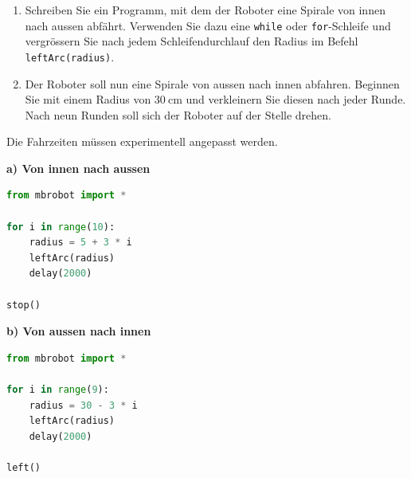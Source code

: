 \begin{myexercise}

    \begin{center}
    \end{center}

    \begin{enumerate}
        \item Schreiben Sie ein Programm, mit dem der Roboter
              eine Spirale von innen nach aussen abfährt.
              Verwenden Sie dazu eine \texttt{while} oder \texttt{for}-Schleife
              und vergrössern Sie nach jedem Schleifendurchlauf
              den Radius im Befehl \texttt{leftArc(radius)}.

        \item Der Roboter soll nun eine Spirale von aussen
              nach innen abfahren. Beginnen Sie mit einem
              Radius von \(\SI{30}{\centi\meter}\) und
              verkleinern Sie diesen nach jeder Runde.
              Nach neun Runden soll sich der Roboter
              auf der Stelle drehen.
    \end{enumerate}


    \begin{myanswer}
        Die Fahrzeiten müssen experimentell angepasst werden.

        \textbf{a) Von innen nach aussen}

        \begin{lstlisting}[language=Python]
from mbrobot import *

for i in range(10):
    radius = 5 + 3 * i
    leftArc(radius)
    delay(2000)

stop()
    \end{lstlisting}

        \textbf{b) Von aussen nach innen}

        \begin{lstlisting}[language=Python]
from mbrobot import *

for i in range(9):
    radius = 30 - 3 * i
    leftArc(radius)
    delay(2000)

left()
    \end{lstlisting}
    \end{myanswer}

\end{myexercise}


